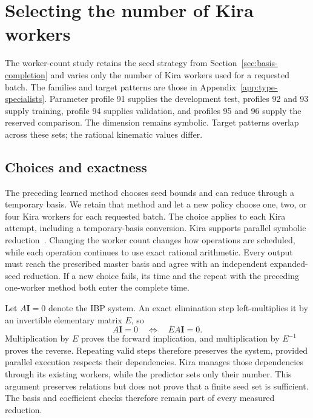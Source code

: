 \section{Selecting the number of Kira workers}
\label{app:thread-policy}
The worker-count study retains the seed strategy from Section~\ref{sec:basis-completion} and varies only the number of Kira workers used for a requested batch. The families and target patterns are those in Appendix~\ref{app:type-specialists}. Parameter profile 91 supplies the
development test, profiles 92 and 93 supply training, profile 94 supplies
validation, and profiles 95 and 96 supply the reserved comparison.
The dimension remains symbolic. Target patterns overlap across these
sets; the rational kinematic values differ.

\subsection{Choices and exactness}
The preceding learned method chooses seed bounds and can reduce through
a temporary basis. We retain that method and let a new policy choose
one, two, or four Kira workers for each requested batch. The choice
applies to each Kira attempt, including a temporary-basis conversion.
Kira supports parallel symbolic reduction~\cite{KiraOriginal}. Changing the worker count changes how operations are scheduled, while each operation continues to use exact rational arithmetic. Every output must reach the
prescribed master basis and agree with an independent expanded-seed
reduction. If a new choice fails, its time and the repeat with the
preceding one-worker method both enter the complete time.

Let $A\mathbf I=0$ denote the IBP system. An exact elimination step
left-multiplies it by an invertible elementary matrix $E$, so
\begin{equation}
 A\mathbf I=0\quad\Longleftrightarrow\quad
 EA\mathbf I=0.
 \label{eq:thread-row-equivalence}
\end{equation}
Multiplication by $E$ proves the forward implication, and multiplication by $E^{-1}$ proves the reverse. Repeating valid steps therefore preserves the system, provided parallel execution respects their dependencies. Kira manages those dependencies through its existing workers, while the predictor sets only their number.
This argument preserves relations but does not prove that a finite seed
set is sufficient. The basis and coefficient checks therefore remain
part of every measured reduction.

